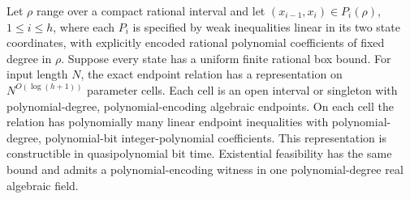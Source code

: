 \begin{theorem}
\label{s5:quasipoly-path}
Let $\rho$ range over a compact rational interval and let
$(x_{i-1},x_i)\in P_i(\rho)$, $1\le i\le h$, where each $P_i$ is
specified by weak inequalities linear in its two state coordinates,
with explicitly encoded rational polynomial coefficients of fixed
degree in $\rho$. Suppose every state has a uniform finite rational
box bound. For input length $N$, the exact endpoint relation has a
representation on $N^{O(\log(h+1))}$ parameter cells. Each cell is an
open interval or singleton with polynomial-degree, polynomial-encoding
algebraic endpoints. On each cell the relation has polynomially many
linear endpoint inequalities with polynomial-degree, polynomial-bit
integer-polynomial coefficients. This representation is constructible
in quasipolynomial bit time. Existential feasibility has the same bound
and admits a polynomial-encoding witness in one polynomial-degree real
algebraic field.
\end{theorem}
